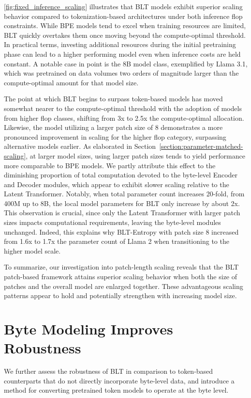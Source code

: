 \autoref{fig:fixed_inference_scaling} illustrates that {\textsc BLT} models exhibit superior scaling behavior compared to tokenization-based architectures under both inference flop constraints. While BPE models tend to excel when training resources are limited, {\textsc BLT} quickly overtakes them once moving beyond the compute-optimal threshold. In practical terms, investing additional resources during the initial pretraining phase can lead to a higher performing model even when inference costs are held constant. A notable case in point is the 8B model class, exemplified by Llama 3.1, which was pretrained on data volumes two orders of magnitude larger than the compute-optimal amount for that model size.

The point at which {\textsc BLT} begins to surpass token-based models has moved somewhat nearer to the compute-optimal threshold with the adoption of models from higher flop classes, shifting from 3x to 2.5x the compute-optimal allocation. Likewise, the model utilizing a larger patch size of 8 demonstrates a more pronounced improvement in scaling for the higher flop category, surpassing alternative models earlier. As elaborated in Section~\ref{section:parameter-matched-scaling}, at larger model sizes, using larger patch sizes tends to yield performance more comparable to BPE models. We partly attribute this effect to the diminishing proportion of total computation devoted to the byte-level Encoder and Decoder modules, which appear to exhibit slower scaling relative to the Latent Transformer. Notably, when total parameter count increases 20-fold, from 400M up to 8B, the local model parameters for {\textsc BLT} only increase by about 2x. This observation is crucial, since only the Latent Transformer with larger patch sizes impacts computational requirements, leaving the byte-level modules unchanged. Indeed, this explains why {\textsc BLT}-Entropy with patch size 8 increased from 1.6x to 1.7x the parameter count of Llama 2 when transitioning to the higher model scale.

To summarize, our investigation into patch-length scaling reveals that the {\textsc BLT} patch-based framework attains superior scaling behavior when both the size of patches and the overall model are enlarged together. These advantageous scaling patterns appear to hold and potentially strengthen with increasing model size.

\section{Byte Modeling Improves Robustness} We further assess the robustness of {\textsc BLT} in comparison to token-based counterparts that do not directly incorporate byte-level data, and introduce a method for converting pretrained token models to operate at the byte level.
\label{sec:robustness}

